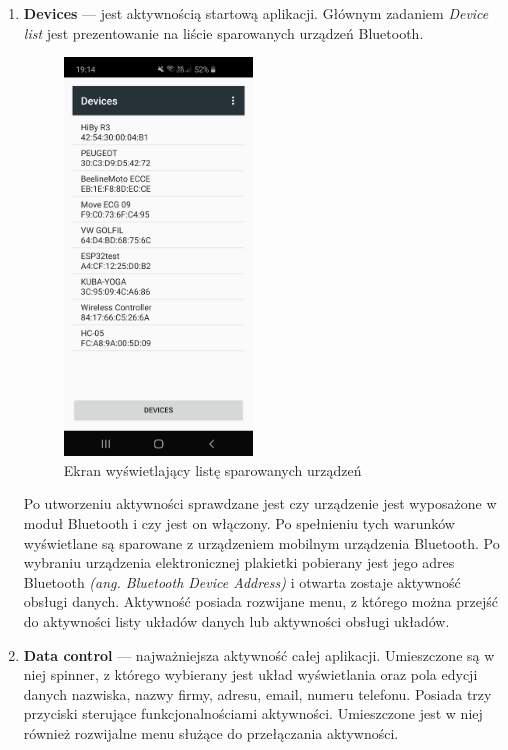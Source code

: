 \documentclass[a4paper,12pt, twoside]{article}
\begin{document}
    	\begin{enumerate}
    	   \item \textbf{Devices} — jest aktywnością startową aplikacji. Głównym zadaniem \textit{Device list} jest prezentowanie na liście  sparowanych urządzeń Bluetooth.
    	   \begin{figure}[H]
    	    \centering
    		    \includegraphics[width=5cm]{images/view_deviceList.jpg}
    			\caption{ Ekran wyświetlający listę sparowanych urządzeń}
                \label{fig:btdevices}
    	   \end{figure}
    	   Po utworzeniu aktywności sprawdzane jest czy urządzenie jest wyposażone w moduł Bluetooth i czy jest on włączony. Po spełnieniu tych warunków wyświetlane są sparowane z urządzeniem mobilnym urządzenia Bluetooth. Po wybraniu urządzenia elektronicznej plakietki pobierany jest jego adres Bluetooth \textit{(ang. Bluetooth Device Address)}\cite{bdaddr} i otwarta zostaje aktywność obsługi danych. Aktywność posiada rozwijane menu, z którego można przejść do aktywności listy układów danych lub aktywności obsługi układów.
    	   \item \textbf{Data control} — najważniejsza aktywność całej aplikacji. Umieszczone są w niej spinner, z którego wybierany jest układ wyświetlania oraz pola edycji danych nazwiska, nazwy firmy, adresu, email, numeru telefonu. Posiada trzy przyciski sterujące funkcjonalnościami aktywności. Umieszczone jest w niej również rozwijalne menu służące do przełączania aktywności.
    	   \begin{figure}[H]
    	        \centering

\end{figure}
\end{enumerate}
\end{document}
